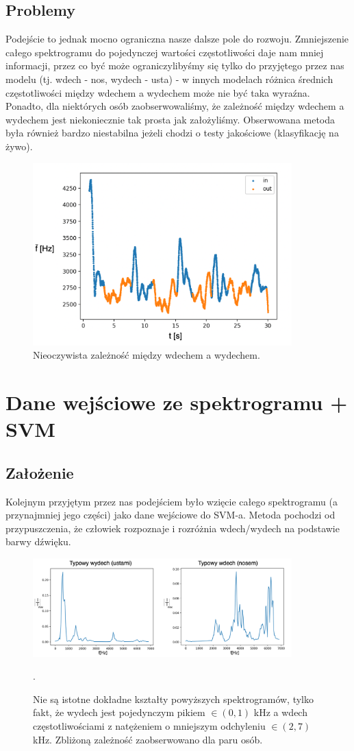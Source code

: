 \documentclass[polish]{article}
\begin{document}
\subsection{Problemy}
Podejście to jednak mocno ograniczna nasze dalsze pole do rozwoju.  Zmniejszenie całego 
spektrogramu do pojedynczej wartości częstotliwości daje nam mniej informacji, przez co 
być może ograniczylibyśmy się tylko do przyjętego przez nas modelu (tj.  wdech - nos, wydech - usta) - w innych
modelach różnica średnich częstotliwości między wdechem a wydechem może nie być taka wyraźna.  Ponadto, dla niektórych osób zaobserwowaliśmy, 
że zależność między wdechem a wydechem jest niekoniecznie tak prosta jak założyliśmy. Obserwowana metoda
była również bardzo niestabilna jeżeli chodzi o testy jakościowe (klasyfikację na żywo).
\begin{figure}[H]
	\centering
	\includegraphics[width=10cm]{problem_srednie_ozn}
	\caption{Nieoczywista zależność między wdechem a wydechem.}
\end{figure}

\section{Dane wejściowe ze spektrogramu + SVM}
\subsection{Założenie}
Kolejnym przyjętym przez nas podejściem było wzięcie całego spektrogramu (a przynajmniej jego części) jako dane wejściowe do SVM-a.  
Metoda pochodzi od przypuszczenia, że człowiek rozpoznaje i rozróżnia wdech/wydech
na podstawie barwy dźwięku.  
\begin{figure}[H]
	\centering
	\includegraphics[width=10cm]{wdech_wydech_spektro}
  	\caption{Nie są istotne dokładne kształty powyższych spektrogramów, tylko fakt, że wydech
jest pojedynczym pikiem $\in (0, 1)$ kHz a wdech częstotliwościami z natężeniem
o mniejszym odchyleniu $\in (2, 7)$ kHz.  Zbliżoną zależność zaobserwowano dla paru osób.}.
\end{figure}
\end{document}
